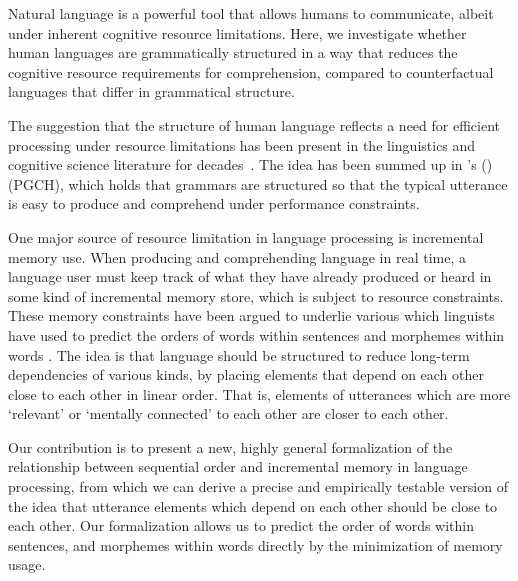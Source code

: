 
Natural language is a powerful tool that allows humans to communicate, albeit under inherent cognitive resource limitations.
Here, we investigate whether human languages are grammatically structured in a way that reduces the cognitive resource requirements for comprehension, compared to counterfactual languages that differ in grammatical structure.

The suggestion that the structure of human language reflects a need for efficient processing under resource limitations has been present in the linguistics and cognitive science literature for decades~\citep{yngve1960model,berwick1984grammatical,hawkins1994performance,chomsky2005three,jaeger2011language,gibson2019efficiency,hahn2020universals}. The idea has been summed up in \citeauthor{hawkins2004efficiency}'s (\citeyear{hawkins2004efficiency})  (PGCH), which holds that grammars are structured so that the typical utterance is easy to produce and comprehend under performance constraints.

One major source of resource limitation in language processing is incremental memory use. 
When producing and comprehending language in real time, a language user must keep track of what they have already produced or heard in some kind of incremental memory store, which is subject to resource constraints.
These memory constraints have been argued to underlie various  which linguists have used to predict the orders of words within sentences and morphemes within words \citep[e.g.][]{behaghel1932deutsche,givon1985iconicity,bybee-morphology-1985,rijkhoff-explaining-1990,hawkins1994performance,hawkins2004efficiency,hawkins2014crosslinguistic,temperley-minimizing-2018}.
The idea is that language should be structured to reduce long-term dependencies of various kinds, by placing elements that depend on each other close to each other in linear order.
That is, elements of utterances which are more `relevant' or `mentally connected' to each other are closer to each other.

Our contribution is to present a new, highly general formalization of the relationship between sequential order and incremental memory in language processing, from which we can derive a precise and empirically testable version of the idea that utterance elements which depend on each other should be close to each other. 
Our formalization allows us to predict the order of words within sentences, and morphemes within words directly by the minimization of memory usage.

